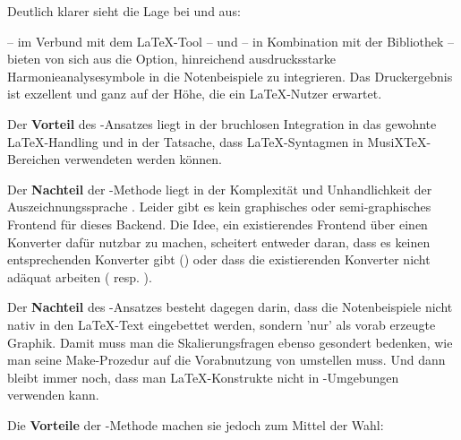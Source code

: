 Deutlich klarer sieht die Lage bei  und
 aus:

 -- im Verbund mit dem \LaTeX-Tool  --
und  -- in Kombination mit der 
Bibliothek  -- bieten von sich aus die Option, hinreichend
ausdrucksstarke Harmonieanalysesymbole in die Notenbeispiele zu integrieren.
Das Druckergebnis ist exzellent und ganz auf der Höhe, die ein \LaTeX-Nutzer
erwartet.

Der \textbf{Vorteil} des -Ansatzes liegt in
der bruchlosen Integration in das gewohnte \LaTeX-Handling und in der Tatsache,
dass \LaTeX-Syntagmen in MusiX\TeX-Bereichen verwendeten werden können.

Der \textbf{Nachteil} der -Methode liegt in
der Komplexität und Unhandlichkeit der Auszeichnungssprache .
Leider gibt es kein graphisches oder semi-graphisches Frontend für dieses
Backend. Die Idee, ein existierendes Frontend über einen Konverter dafür nutzbar
zu machen, scheitert entweder daran, dass es keinen entsprechenden Konverter
gibt () oder dass die existierenden Konverter nicht adäquat
arbeiten ( resp. ).

Der \textbf{Nachteil} des -Ansatzes besteht
dagegen darin, dass die Notenbeispiele nicht nativ in den \LaTeX-Text
eingebettet werden, sondern 'nur' als vorab erzeugte Graphik. Damit muss man die
Skalierungsfragen ebenso gesondert bedenken, wie man seine Make-Prozedur auf die
Vorabnutzung von  umstellen muss. Und dann bleibt immer noch,
dass man \LaTeX-Konstrukte nicht in -Umgebungen verwenden kann.

Die \textbf{Vorteile} der -Methode machen sie
jedoch zum Mittel der Wahl:

